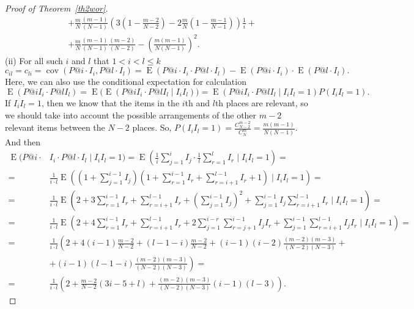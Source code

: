 \documentclass{tpms-l}
\theoremstyle{definition}
\theoremstyle{remark}
\numberwithin{equation}{section}
\begin{document}
\begin{proof}[Proof of Theorem~\ref {th2wor}]
\begin{equation*}
\begin{split}
& + \frac{m}{N}\frac{(m-1)}{(N-1)}\left(3\left(1-\frac{m-2}{N-2}\right)-2\frac{m}{N}\left(1-\frac{m-1}{N-1}\right)\right)\frac{1}{i}+\\ 
& + \frac{m}{N} \frac{(m-1)}{(N-1)}\frac{(m-2)}{(N-2)}-\left(\frac{m(m-1)}{N(N-1)}\right)^2 .
\end{split}
\end{equation*}
(ii)
For all such $i$ and $l$ that $1<i<l\leq k$
$$c_{il}=c_{li}=\operatorname{cov}(P@i\cdot I_i,P@l\cdot I_l)=\operatorname{E}(P@i\cdot I_i\cdot P@l\cdot I_l)-\operatorname{E}(P@i\cdot I_i)\cdot \operatorname{E}(P@l\cdot I_l).$$
Here, we can also use the conditional expectation for calculation
\[
\operatorname{E}(P@i I_i\cdot P@l I_l) = \operatorname{E}\big(\operatorname{E}(P@i I_i\cdot P@l I_l \mid I_i I_l)\big) 
= \operatorname{E}(P@i I_i\cdot P@l I_l \mid I_i I_l = 1)  P(I_i I_l = 1).
\]
If $I_iI_l=1$, then we know that the items in the $i$th and $l$th places are relevant, so we should take into account the possible arrangements of the other $m-2$ relevant items between the $N-2$ places. So,  
$P(I_iI_l=1)=\frac{C_{N-2}^{m-2}}{C_N^m}=\frac{m(m-1)}{N(N-1)}$. And then
\begin{equation*}
\begin{split}
\operatorname{E}(P@i\cdot & I_i\cdot P@l\cdot I_l \mid I_i I_l = 1)=\operatorname{E}\left(\frac{1}{i} \sum_{j=1}^{i} I_j 
\cdot \frac{1}{l} \sum_{r=1}^{l} I_r \mid I_i I_l = 1\right)=\\
= &\frac{1}{i\cdot l}\operatorname{E}\left(\left(1+\sum_{j=1}^{i-1}I_j\right)\left(1+\sum_{r=1}^{i-1}I_r+\sum_{r=i+1}^{l-1}I_r+1\right) \mid I_iI_l=1\right)=\\
= &\frac{1}{i\cdot l}\operatorname{E}\left(2+3\sum_{r=1}^{i-1}I_r+\sum_{r=i+1}^{l-1}I_r+\left(\sum_{j=1}^{i-1}I_j\right)^2+\sum_{j=1}^{i-1}I_j\sum_{r=i+1}^{l-1}I_r \mid I_iI_l=1\right)=\\
=&\frac{1}{i\cdot l}\operatorname{E}\left(2+4\sum_{r=1}^{i-1}I_r+\sum_{r=i+1}^{l-1}I_r+2\sum_{j=1}^{i-r}\sum_{r=j+1}^{i-1}I_jI_r+\sum_{j=1}^{i-1}\sum_{r=i+1}^{l-1}I_jI_r \mid I_iI_l=1\right)=\\
=&\frac{1}{i\cdot l}\left(2+4(i-1)\frac{m-2}{N-2}+(l-1-i)\frac{m-2}{N-2}+(i-1)(i-2)\frac{(m-2)(m-3)}{(N-2)(N-3)}+\right.\\
& \left. +(i-1)(l-1-i)\frac{(m-2)(m-3)}{(N-2)(N-3)}\right)=\\
= &\frac{1}{i\cdot l}\left(2+\frac{m-2}{N-2}(3i-5+l)+\frac{(m-2)(m-3)}{(N-2)(N-3)}(i-1)(l-3)\right).
\end{split}
\end{equation*}

\end{proof}
\end{document}
